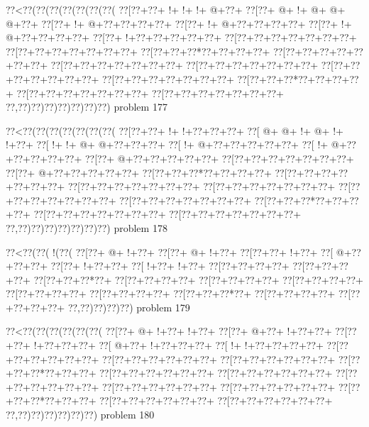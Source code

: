 \vbox{\vbox{\goo
\0??<\0??(\0??(\0??(\0??(\0??(\0??(\0??(
\0??[\0??+\0??+\- !+\- !+\- !+\- @+\0??+
\0??[\0??+\- @+\- !+\- @+\- @+\- @+\0??+
\0??[\0??+\- !+\- @+\0??+\0??+\0??+\0??+
\0??[\0??+\- !+\- @+\0??+\0??+\0??+\0??+
\0??[\0??+\- !+\- @+\0??+\0??+\0??+\0??+
\0??[\0??+\- !+\0??+\0??+\0??+\0??+\0??+
\0??[\0??+\0??+\0??+\0??+\0??+\0??+\0??+
\0??[\0??+\0??+\0??+\0??+\0??+\0??+\0??+
\0??[\0??+\0??+\0??*\0??+\0??+\0??+\0??+
\0??[\0??+\0??+\0??+\0??+\0??+\0??+\0??+
\0??[\0??+\0??+\0??+\0??+\0??+\0??+\0??+
\0??[\0??+\0??+\0??+\0??+\0??+\0??+\0??+
\0??[\0??+\0??+\0??+\0??+\0??+\0??+\0??+
\0??[\0??+\0??+\0??+\0??+\0??+\0??+\0??+
\0??[\0??+\0??+\0??*\0??+\0??+\0??+\0??+
\0??[\0??+\0??+\0??+\0??+\0??+\0??+\0??+
\0??[\0??+\0??+\0??+\0??+\0??+\0??+\0??+
\0??,\0??)\0??)\0??)\0??)\0??)\0??)\0??)
}
\hfil problem 177\hfil\break
}

\vbox{\vbox{\goo
\0??<\0??(\0??(\0??(\0??(\0??(\0??(\0??(
\0??[\0??+\0??+\- !+\- !+\0??+\0??+\0??+
\0??[\- @+\- @+\- !+\- @+\- !+\- !+\0??+
\0??[\- !+\- !+\- @+\- @+\0??+\0??+\0??+
\0??[\- !+\- @+\0??+\0??+\0??+\0??+\0??+
\0??[\- !+\- @+\0??+\0??+\0??+\0??+\0??+
\0??[\0??+\- @+\0??+\0??+\0??+\0??+\0??+
\0??[\0??+\0??+\0??+\0??+\0??+\0??+\0??+
\0??[\0??+\- @+\0??+\0??+\0??+\0??+\0??+
\0??[\0??+\0??+\0??*\0??+\0??+\0??+\0??+
\0??[\0??+\0??+\0??+\0??+\0??+\0??+\0??+
\0??[\0??+\0??+\0??+\0??+\0??+\0??+\0??+
\0??[\0??+\0??+\0??+\0??+\0??+\0??+\0??+
\0??[\0??+\0??+\0??+\0??+\0??+\0??+\0??+
\0??[\0??+\0??+\0??+\0??+\0??+\0??+\0??+
\0??[\0??+\0??+\0??*\0??+\0??+\0??+\0??+
\0??[\0??+\0??+\0??+\0??+\0??+\0??+\0??+
\0??[\0??+\0??+\0??+\0??+\0??+\0??+\0??+
\0??,\0??)\0??)\0??)\0??)\0??)\0??)\0??)
}
\hfil problem 178\hfil\break
}

\vbox{\vbox{\goo
\0??<\0??(\0??(\- !(\0??(
\0??[\0??+\- @+\- !+\0??+
\0??[\0??+\- @+\- !+\0??+
\0??[\0??+\0??+\- !+\0??+
\0??[\- @+\0??+\0??+\0??+
\0??[\0??+\- !+\0??+\0??+
\0??[\- !+\0??+\- !+\0??+
\0??[\0??+\0??+\0??+\0??+
\0??[\0??+\0??+\0??+\0??+
\0??[\0??+\0??+\0??*\0??+
\0??[\0??+\0??+\0??+\0??+
\0??[\0??+\0??+\0??+\0??+
\0??[\0??+\0??+\0??+\0??+
\0??[\0??+\0??+\0??+\0??+
\0??[\0??+\0??+\0??+\0??+
\0??[\0??+\0??+\0??*\0??+
\0??[\0??+\0??+\0??+\0??+
\0??[\0??+\0??+\0??+\0??+
\0??,\0??)\0??)\0??)\0??)
}
\hfil problem 179\hfil\break
}

\vbox{\vbox{\goo
\0??<\0??(\0??(\0??(\0??(\0??(\0??(
\0??[\0??+\- @+\- !+\0??+\- !+\0??+
\0??[\0??+\- @+\0??+\- !+\0??+\0??+
\0??[\0??+\0??+\- !+\0??+\0??+\0??+
\0??[\- @+\0??+\- !+\0??+\0??+\0??+
\0??[\- !+\- !+\0??+\0??+\0??+\0??+
\0??[\0??+\0??+\0??+\0??+\0??+\0??+
\0??[\0??+\0??+\0??+\0??+\0??+\0??+
\0??[\0??+\0??+\0??+\0??+\0??+\0??+
\0??[\0??+\0??+\0??*\0??+\0??+\0??+
\0??[\0??+\0??+\0??+\0??+\0??+\0??+
\0??[\0??+\0??+\0??+\0??+\0??+\0??+
\0??[\0??+\0??+\0??+\0??+\0??+\0??+
\0??[\0??+\0??+\0??+\0??+\0??+\0??+
\0??[\0??+\0??+\0??+\0??+\0??+\0??+
\0??[\0??+\0??+\0??*\0??+\0??+\0??+
\0??[\0??+\0??+\0??+\0??+\0??+\0??+
\0??[\0??+\0??+\0??+\0??+\0??+\0??+
\0??,\0??)\0??)\0??)\0??)\0??)\0??)
}
\hfil problem 180\hfil\break
}

